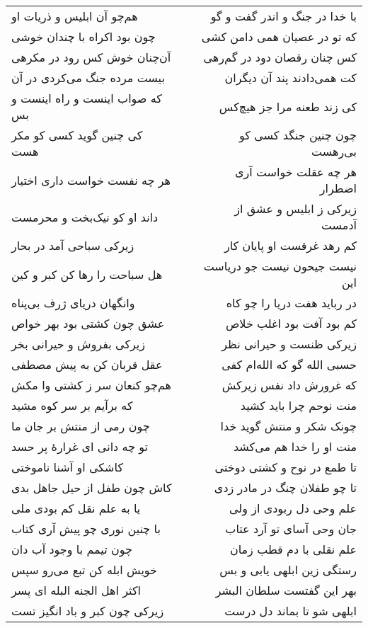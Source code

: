 \begin{center}
\begin{longtable}{l p{0.5cm} r}
\\
هم‌چو آن ابلیس و ذریات او
&&
با خدا در جنگ و اندر گفت و گو
\\
چون بود اکراه با چندان خوشی
&&
که تو در عصیان همی دامن کشی
\\
آن‌چنان خوش کس رود در مکرهی
&&
کس چنان رقصان دود در گم‌رهی
\\
بیست مرده جنگ می‌کردی در آن
&&
کت همی‌دادند پند آن دیگران
\\
که صواب اینست و راه اینست و بس
&&
کی زند طعنه مرا جز هیچ‌کس
\\
کی چنین گوید کسی کو مکر هست
&&
چون چنین جنگد کسی کو بی‌رهست
\\
هر چه نفست خواست داری اختیار
&&
هر چه عقلت خواست آری اضطرار
\\
داند او کو نیک‌بخت و محرمست
&&
زیرکی ز ابلیس و عشق از آدمست
\\
زیرکی سباحی آمد در بحار
&&
کم رهد غرقست او پایان کار
\\
هل سباحت را رها کن کبر و کین
&&
نیست جیحون نیست جو دریاست این
\\
وانگهان دریای ژرف بی‌پناه
&&
در رباید هفت دریا را چو کاه
\\
عشق چون کشتی بود بهر خواص
&&
کم بود آفت بود اغلب خلاص
\\
زیرکی بفروش و حیرانی بخر
&&
زیرکی ظنست و حیرانی نظر
\\
عقل قربان کن به پیش مصطفی
&&
حسبی الله گو که الله‌ام کفی
\\
هم‌چو کنعان سر ز کشتی وا مکش
&&
که غرورش داد نفس زیرکش
\\
که برآیم بر سر کوه مشید
&&
منت نوحم چرا باید کشید
\\
چون رمی از منتش بر جان ما
&&
چونک شکر و منتش گوید خدا
\\
تو چه دانی ای غرارهٔ پر حسد
&&
منت او را خدا هم می‌کشد
\\
کاشکی او آشنا ناموختی
&&
تا طمع در نوح و کشتی دوختی
\\
کاش چون طفل از حیل جاهل بدی
&&
تا چو طفلان چنگ در مادر زدی
\\
یا به علم نقل کم بودی ملی
&&
علم وحی دل ربودی از ولی
\\
با چنین نوری چو پیش آری کتاب
&&
جان وحی آسای تو آرد عتاب
\\
چون تیمم با وجود آب دان
&&
علم نقلی با دم قطب زمان
\\
خویش ابله کن تبع می‌رو سپس
&&
رستگی زین ابلهی یابی و بس
\\
اکثر اهل الجنه البله ای پسر
&&
بهر این گفتست سلطان البشر
\\
زیرکی چون کبر و باد انگیز تست
&&
ابلهی شو تا بماند دل درست
\\

\end{longtable}
\end{center}
